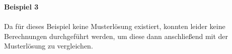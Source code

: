 \newpage
\noindent
\textbf{Beispiel 3} \\ \\
Da für dieses Beispiel keine Musterlösung existiert, konnten leider keine Berechnungen durchgeführt werden, um diese dann anschließend mit der Musterlösung zu vergleichen. \\ \\